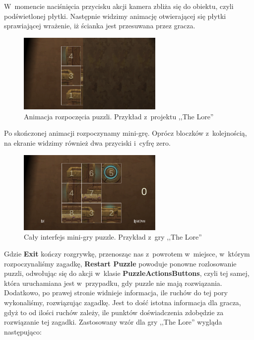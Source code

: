 \documentclass[oneside,polski,logo]{amuthesis}
\begin{document}
W~momencie naciśnięcia przycisku akcji kamera zbliża się do obiektu, czyli podświetlonej płytki. Następnie widzimy animację otwierającej się płytki sprawiającej wrażenie, iż ścianka jest przesuwana przez gracza.
\begin{figure}[h]
	\centering
	\includegraphics[width=7cm]{images/tyrek/otwieraniePuzzli.png}
	\caption{Animacja rozpoczęcia puzzli. Przykład z~projektu ,,The Lore''}
\end{figure}

Po skończonej animacji rozpoczynamy mini-grę. Oprócz bloczków z~kolejnością, na ekranie widzimy również dwa przyciski i~cyfrę zero.
\begin{figure}[h]
	\centering
	\includegraphics[width=7cm]{images/tyrek/puzzlebuttons.png}
	\caption{Cały interfejs mini-gry puzzle. Przykład z~gry ,,The Lore''}
\end{figure}

Gdzie \textbf{Exit} kończy rozgrywkę, przenosząc nas z~powrotem w~miejsce, w~którym rozpoczynaliśmy zagadkę, \textbf{Restart Puzzle} powoduje ponowne rozlosowanie puzzli, odwołując się do akcji w~klasie \textbf{PuzzleActionsButtons}, czyli tej samej, która uruchamiana jest w~przypadku, gdy puzzle nie mają rozwiązania. Dodatkowo, po prawej stronie widnieje informacja, ile ruchów do tej pory wykonaliśmy, rozwiązując zagadkę. Jest to dość istotna informacja dla gracza, gdyż to od ilości ruchów zależy, ile punktów doświadczenia zdobędzie za rozwiązanie tej zagadki. Zastosowany wzór dla gry ,,The Lore'' wygląda następująco:
\end{document}
